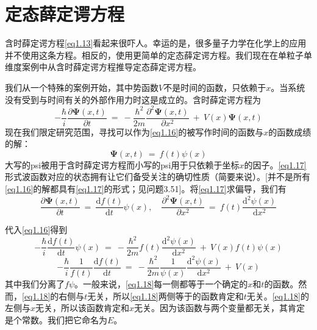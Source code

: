 \documentclass[12pt,a4paper,openany]{ctexbook}
\begin{document}
\section{定态薛定谔方程}
\begin{flushleft}
    \setlength{\parindent}{2em}
含时薛定谔方程\eqref{eq1.13}看起来很吓人。幸运的是，很多量子力学在化学上的应用并不使用这条方程。相反的，使用更简单的定态薛定谔方程。我们现在在单粒子单维度案例中从含时薛定谔方程推导定态薛定谔方程。

我们从一个特殊的案例开始，其中势函数$V$不是时间的函数，只依赖于$x$。当系统没有受到与时间有关的外部作用力时这是成立的。含时薛定谔方程为
\begin{equation}
    -\frac{\hbar}{i}\frac{\partial\bm{\Psi}(x,t)}{\partial t}\ =\ -\frac{\hbar^2}{2m}\frac{\partial^2\bm{\Psi}(x,t)}{\partial x^2}\ +\ V(x)\bm{\Psi}(x,t)
    \label{eq1.16}
\end{equation}
现在我们限定研究范围，寻找可以作为\eqref{eq1.16}的被写作时间的函数与$x$的函数成绩的解：
\begin{equation}
    \boxed{\bm{\Psi}(x,t)\ =\ f(t)\psi (x)}
    \label{eq1.17}
\end{equation}
大写的psi被用于含时薛定谔方程而小写的psi用于只依赖于坐标$x$的因子。\eqref{eq1.17}形式波函数对应的状态拥有让它们备受关注的确切性质（简要来说）。[并不是所有\eqref{eq1.16}的解都具有\eqref{eq1.17}的形式；见问题3.51]。将\eqref{eq1.17}求偏导，我们有
\begin{equation*}
    \frac{\partial\bm{\Psi}(x,t)}{\partial t}\ =\ \frac{\mathrm{d}f(t)}{\mathrm{d}t}\psi(x),\quad\frac{\partial^2\bm{\Psi}(x,t)}{\partial x^2}\ =\ f(t)\frac{\mathrm{d}^2\psi(x)}{\mathrm{d}x^2}
\end{equation*}

代入\eqref{eq1.16}得到
\begin{equation*}
    -\frac{\hbar}{i}\frac{\mathrm{d}f(t)}{\mathrm{d}t}\psi(x)\ =\ -\frac{\hbar^2}{2m}f(t)\frac{\mathrm{d}^2\psi(x)}{\mathrm{d}x^2}\ +\ V(x)f(t)\psi(x)
\end{equation*}
\begin{equation}
    -\frac{\hbar}{i}\frac{1}{f(t)}\frac{\mathrm{d}f(t)}{\mathrm{d}t}\ =\ -\frac{\hbar^2}{2m}\frac{1}{\psi(x)}\frac{\mathrm{d}^2\psi(x)}{\mathrm{d}x^2}\ +\ V(x)
    \label{eq1.18}
\end{equation}
其中我们分离了$f\psi$。一般来说，\eqref{eq1.18}每一侧都等于一个确定的$x$和$t$的函数。然而，\eqref{eq1.18}的右侧与$t$无关，所以\eqref{eq1.18}两侧等于的函数肯定和$t$无关。\eqref{eq1.18}的左侧与$x$无关，所以该函数肯定和$x$无关。因为该函数与两个变量都无关，其肯定是个常数。我们把它命名为$E$。


\end{flushleft}
\end{document}
